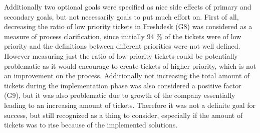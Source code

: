 Additionally two optional goals were specified as nice side effects of primary and secondary goals, but not necessarily goals to put much effort on. First of all, decreasing the ratio of low
priority tickets in Freshdesk (G8) was considered as a measure of process clarification, since initially 94 \% of the tickets were of low priority and the definitions between different priorities
were not well defined. However measuring just the ratio of low priority tickets could be potentially problematic as it would encourage to create tickets of higher priority, which is not
an improvement on the process. Additionally not increasing the total amount of tickets during the implementation phase was also considered a positive factor (G9), but it was also problematic
due to growth of the company essentially leading to an increasing amount of tickets. Therefore it was not a definite goal for success, but still recognized as a thing to consider, especially
if the amount of tickets was to rise because of the implemented solutions.

